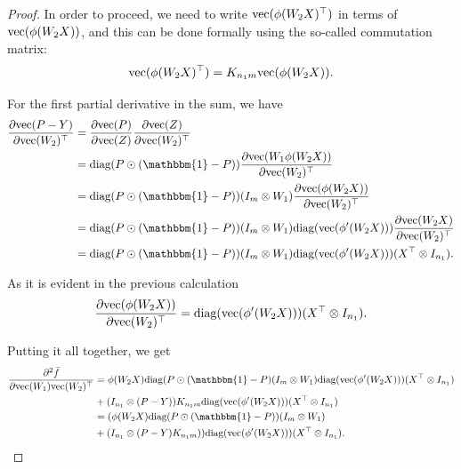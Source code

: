 \documentclass[a4paper,11pt]{article}
\newcommand{\1}{\mathbbm{1}}
\theoremstyle{plain}
\begin{document}
\begin{proof}
In order to proceed, we need to write $\textnormal{vec}(\phi(W_2 X)^\top)$ in terms of $\textnormal{vec}(\phi(W_2 X))$, and this can be done formally using the so-called commutation matrix:
\begin{equation*}
   \textnormal{vec}(\phi(W_2 X)^\top) = K_{n_1 m}  \textnormal{vec}(\phi(W_2 X)).
\end{equation*}

For the first partial derivative in the sum, we have
\begin{align*}
  \frac{\partial \textnormal{vec} (P-Y) }{\partial \textnormal{vec}(W_2)^\top} &= \frac{\partial \textnormal{vec}(P) }{\partial \textnormal{vec}(Z)} \frac{\partial \textnormal{vec}(Z) }{\partial \textnormal{vec}(W_2)^\top} \\&= \textnormal{diag}(P \odot (\1-P)) \frac{\partial \textnormal{vec} (W_1\phi(W_2 X)) }{\partial \textnormal{vec}(W_2)^\top}\\ &  = \textnormal{diag}(P \odot (\1-P))(I_m \otimes W_1)\frac{\partial \textnormal{vec} (\phi(W_2 X)) }{\partial \textnormal{vec}(W_2)^\top} \\ & = \textnormal{diag}(P \odot (\1-P)) (I_m \otimes W_1) \textnormal{diag}(\textnormal{vec}(\phi'(W_2 X))) \frac{\partial \textnormal{vec}(W_2 X)}{\partial \textnormal{vec}(W_2)^\top} \\ & = \textnormal{diag}(P \odot (\1-P)) (I_m \otimes W_1) \textnormal{diag}(\textnormal{vec}(\phi'(W_2 X))) (X^\top \otimes I_{n_1}).
\end{align*}

As it is evident in the previous calculation
\begin{equation*}
    \frac{\partial \textnormal{vec} (\phi(W_2 X)) }{\partial \textnormal{vec}(W_2)^\top} = \textnormal{diag}(\textnormal{vec}(\phi'(W_2 X))) (X^\top \otimes I_{n_1}).
\end{equation*}

Putting it all together, we get
\begin{align*}
    \frac{\partial^2 \bar f}{\partial \textnormal{vec}(W_1) \textnormal{vec}(W_2)^\top } & = \phi(W_2 X)\textnormal{diag}(P \odot (\1-P) (I_m \otimes W_1) \textnormal{diag}(\textnormal{vec}(\phi'(W_2 X))) (X^\top \otimes I_{n_1}) \\ & +(I_{n_1} \otimes (P-Y)) K_{n_1 m} \textnormal{diag}(\textnormal{vec}(\phi'(W_2 X))) (X^\top \otimes I_{n_1}) \\ & =
    (\phi(W_2 X)\textnormal{diag}(P \odot (\1-P)) (I_m \otimes W_1) \\ & + (I_{n_1} \otimes (P-Y)K_{n_1 m})) \textnormal{diag}(\textnormal{vec}(\phi'(W_2 X))) (X^\top \otimes I_{n_1}).
\end{align*}


\end{proof}
\end{document}

